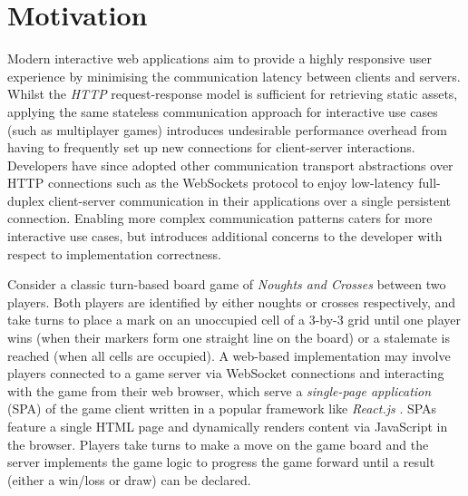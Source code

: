 %
%
%
%
%
%

\section{Motivation}
\label{section:intro}

Modern interactive web applications aim to 
provide a highly responsive user experience by 
minimising the communication latency between clients and servers. 
Whilst the \textit{HTTP} request-response model is 
sufficient for retrieving static assets, applying the same 
stateless communication approach for interactive use cases 
(such as multiplayer games) introduces undesirable 
performance overhead from having to frequently set up 
new connections for client-server interactions. 
Developers have since adopted other communication 
transport abstractions over HTTP connections such as the WebSockets protocol \cite{WebSocketRFC} to enjoy low-latency full-duplex 
client-server communication in their applications over 
a single persistent connection. 
Enabling more complex communication patterns caters for 
more interactive use cases, but introduces additional 
concerns to the developer with respect to implementation correctness.

Consider a classic turn-based board game of \textit{Noughts and Crosses} 
between two players. Both players are identified by either noughts or crosses 
respectively, and take turns to place a mark on an unoccupied cell 
of a 3-by-3 grid until one player wins (when their markers form 
one straight line on the board) or a stalemate is reached 
(when all cells are occupied). A web-based implementation may 
involve players connected to a game server via WebSocket connections 
and interacting with the game from their web browser, which serve 
a \textit{single-page application} (SPA) of the game client written 
in a popular framework like \textit{React.js} \cite{React}. 
SPAs feature a single HTML page and dynamically renders content 
via JavaScript in the browser. 
Players take turns to make a move on the game board and the server 
implements the game logic to progress the game forward until 
a result (either a win/loss or draw) can be declared. 

